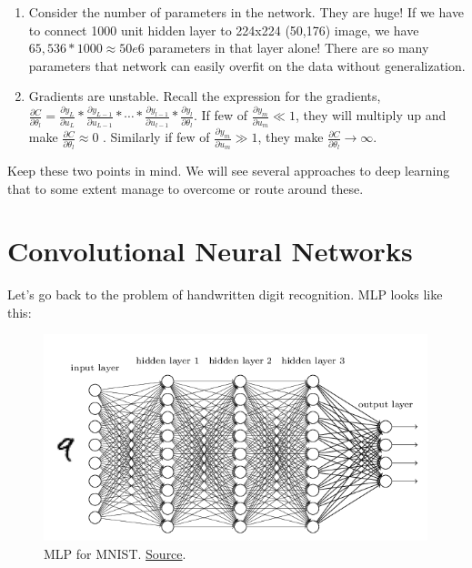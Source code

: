 \documentclass[a4paper]{tufte-handout}
\begin{document}
\begin{enumerate}
\item
  Consider the number of parameters in the network. They are huge! If we
  have to connect 1000 unit hidden layer to 224x224 (50,176) image, we
  have \(65,536*1000 \approx 50e6\) parameters in that layer alone!
  There are so many parameters that network can easily overfit on the
  data without generalization.
\item
  Gradients are unstable. Recall the expression for the gradients,
  \(\frac{\partial C}{\partial \theta_l} = \frac{\partial y_L}{\partial u_L} * \frac{\partial y_{L-1}}{\partial u_{L-1}} * \cdots * \frac{\partial y_{l-1}}{\partial u_{l-1}} * \frac{\partial y_l}{\partial \theta_l}\).
  If few of \(\frac{\partial y_m}{\partial u_m} \ll 1\), they will
  multiply up and make
  \(\frac{\partial C}{\partial \theta_l} \approx 0\)
  . Similarly if few of
  \(\frac{\partial y_m}{\partial u_m} \gg 1\), they make
  \(\frac{\partial C}{\partial \theta_l} \to \infty\). 
\end{enumerate}

Keep these two points in mind. We will see several approaches to deep
learning that to some extent manage to overcome or route around these.


\section{Convolutional Neural
Networks}\label{convolutional-neural-networks}

Let's go back to the problem of handwritten digit recognition. MLP looks
like this:

\begin{figure}
  \includegraphics[height=60mm]{mnist_net.png}
  \caption{MLP for MNIST.
  \href{http://neuralnetworksanddeeplearning.com/chap5.html\%22}{Source}.}
\end{figure}
\end{document}
